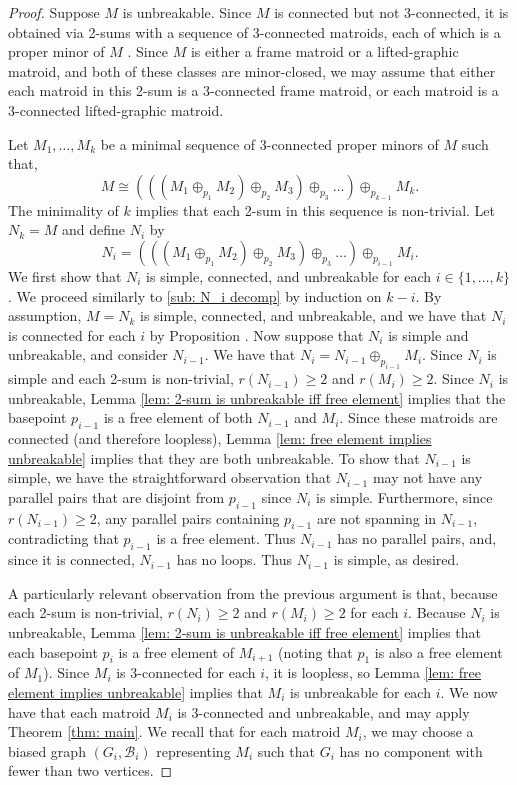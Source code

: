 \documentclass[12pt]{article}
\theoremstyle{definition}
\theoremstyle{plain} %
\newcommand{\cB}{\mathcal{B}}
\begin{document}
\begin{proof}
    Suppose $M$ is unbreakable. Since $M$ is connected but not 3-connected, it is obtained via 2-sums with a sequence of 3-connected matroids, each of which is a proper minor of $M$ \cite[Corollary 8.3.4]{Oxley2011}. Since $M$ is either a frame matroid or a lifted-graphic matroid, and both of these classes are minor-closed, we may assume that either each matroid in this 2-sum is a 3-connected frame matroid, or each matroid is a 3-connected lifted-graphic matroid. 
    
    Let $M_1,\ldots,M_k$ be a minimal sequence of 3-connected proper minors of $M$ such that,
    $$
    M\cong (((M_1\oplus_{p_1}M_2)\oplus_{p_2}M_3)\oplus_{p_3}\ldots)\oplus_{p_{k-1}}M_k.
    $$
    The minimality of $k$ implies that each 2-sum in this sequence is non-trivial. Let $N_k=M$ and define $N_i$ by
    $$
    N_i=(((M_1\oplus_{p_1}M_2)\oplus_{p_2}M_3)\oplus_{p_3}\ldots)\oplus_{p_{i-1}}M_i.
    $$
    We first show that $N_i$ is simple, connected, and unbreakable for each $i\in\{1,\ldots,k\}$. We proceed similarly to \ref{sub: N_i decomp} by induction on $k-i$. By assumption, $M=N_k$ is simple, connected, and unbreakable, and we have that $N_i$ is connected for each $i$ by Proposition \cite[7.1.22]{Oxley2011}. Now suppose that $N_i$ is simple and unbreakable, and consider $N_{i-1}$. We have that $N_i=N_{i-1}\oplus_{p_{i-1}}M_{i}$. Since $N_i$ is simple and each 2-sum is non-trivial, $r(N_{i-1})\geq2$ and $r(M_i)\geq2$. Since $N_i$ is unbreakable, Lemma \ref{lem: 2-sum is unbreakable iff free element} implies that the basepoint $p_{i-1}$ is a free element of both $N_{i-1}$ and $M_i$. Since these matroids are connected (and therefore loopless), Lemma \ref{lem: free element implies unbreakable} implies that they are both unbreakable. To show that $N_{i-1}$ is simple, we have the straightforward observation that $N_{i-1}$ may not have any parallel pairs that are disjoint from $p_{i-1}$ since $N_i$ is simple. Furthermore, since $r(N_{i-1})\geq2$, any parallel pairs containing $p_{i-1}$ are not spanning in $N_{i-1}$, contradicting that $p_{i-1}$ is a free element. Thus $N_{i-1}$ has no parallel pairs, and, since it is connected, $N_{i-1}$ has no loops. Thus $N_{i-1}$ is simple, as desired. 


    A particularly relevant observation from the previous argument is that, because each 2-sum is non-trivial, $r(N_i) \ge 2$ and $r(M_i)\geq2$ for each $i$. Because $N_i$ is unbreakable, Lemma \ref{lem: 2-sum is unbreakable iff free element} implies that each basepoint $p_i$ is a free element of $M_{i+1}$ (noting that $p_1$ is also a free element of $M_1$). Since $M_i$ is 3-connected for each $i$, it is loopless, so Lemma \ref{lem: free element implies unbreakable} implies that $M_i$ is unbreakable for each $i$. We now have that each matroid $M_i$ is 3-connected and unbreakable, and may apply Theorem \ref{thm: main}. We recall that for each matroid $M_i$, we may choose a biased graph $(G_i,\cB_i)$ representing $M_i$ such that $G_i$ has no component with fewer than two vertices.


\end{proof}
\end{document}
